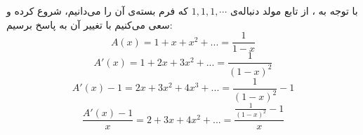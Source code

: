 \p
با توجه به
،
از تابع مولد دنباله‌ی 
$ 1, 1, 1, \cdots $
که فرم بسته‌ی آن را می‌دانیم، شروع کرده و سعی می‌کنیم با تغییر آن به پاسخ برسیم:
$$ A(x) = 1 + x + x^2 + ... = \frac{1}{1 - x} $$ 
$$ A'(x) = 1 + 2x + 3x^2 + ... = \frac{1}{(1 - x)^2}$$
$$ A'(x) - 1 = 2x + 3x^2 + 4x^3 + ... = \frac{1}{(1 - x)^2} - 1$$
$$ \frac{A'(x) - 1}{x} = 2 + 3x + 4x^2 + ... = \frac{\frac{1}{(1 - x)^2} - 1}{x}$$